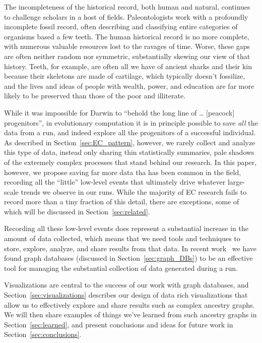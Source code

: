 The incompleteness of the historical record, both human and natural, continues
to challenge scholars in a host of fields. Paleontologists work with a 
profoundly
incomplete fossil record, often describing and classifying entire categories of
organisms based a few teeth. The human historical record is no more complete,
with numerous valuable resources lost to the ravages of time. Worse, these 
gaps are often neither random nor symmetric, substantially skewing our view 
of that history. Teeth, for example, are often all we have of ancient 
sharks and their kin because their skeletons are made of cartilage, which
typically doesn't fossilize, and the lives and ideas of people with wealth, 
power, and education are far more likely to be preserved than those of the
poor and illiterate.

While it was impossible for Darwin to ``behold the long line of \ldots 
[peacock] progenitors'', in evolutionary computation it is in principle possible
to save \emph{all} the data from a run, and indeed explore all the progenitors
of a successful individual. As described in Section~\ref{sec:EC_pattern},
however, we rarely collect and analyze this type of data, instead only sharing
thin statistically summaries, pale shadows of the extremely complex 
processes that stand behind our research. 
In this paper, however, we propose
saving far more data tha has been common in the field, recording all the ``little'' low-level events that ultimately drive whatever large-scale trends 
we observe in our runs. While the majority of EC research fails to record more
than a tiny fraction of this detail, there are exceptions, some of which 
will be discussed in Section~\ref{sec:related}.

Recording all these low-level events does represent a substantial increase 
in the amount of data
collected, which means that we need tools and techniques to store, explore,
analyze, and share results from that data. In recent work~\cite{graph_db_work}
we have found graph databases (discussed in
Section~\ref{sec:graph_DBs}) to be an effective tool for managing the 
substantial collection of data generated during a run. 

Visualizations are central to the success
of our work with graph databases, and Section~\ref{sec:visualizations}
describes our design of data rich 
visualizations that allow us to effectively explore and share results such as
complex ancestry graphs. We will then share examples of things we've learned
from such ancestry graphs in Section~\ref{sec:learned}, and present conclusions
and ideas for future work in Section~\ref{sec:conclusions}.

